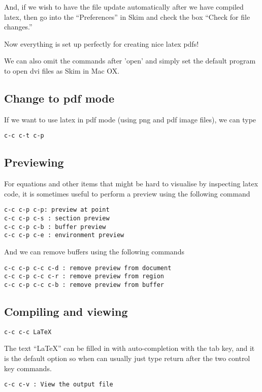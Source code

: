 \documentclass[a4paper, 10pt]{article}
\begin{document}
And, if we wish to have the file update automatically after we have compiled latex, then go into the ``Preferences'' in Skim and check the box ``Check for file changes.''

Now everything is set up perfectly for creating nice latex pdfs!

We can also omit the commands after 'open' and simply set the default
program to open dvi files as Skim in Mac OX.

\subsection*{Change to pdf mode}
\label{sec:change-pdf-mode}

If we want to use latex in pdf mode (using png and pdf image files),
we can type
\begin{verbatim}
c-c c-t c-p
\end{verbatim}

\subsection{Previewing}
\label{sec:previewing}

For equations and other items that might be hard to visualise by
inspecting latex code, it is sometimes useful to perform a preview
using the following command
\begin{verbatim}
c-c c-p c-p: preview at point
c-c c-p c-s : section preview 
c-c c-p c-b : buffer preview
c-c c-p c-e : environment preview
\end{verbatim}

And we can remove buffers using the following commands
\begin{verbatim}
c-c c-p c-c c-d : remove preview from document
c-c c-p c-c c-r : remove preview from region
c-c c-p c-c c-b : remove preview from buffer
\end{verbatim}



\subsection*{Compiling and viewing}
\begin{verbatim}
c-c c-c LaTeX
\end{verbatim}
The text ``LaTeX'' can be filled in with auto-completion with the tab key, and it is the default option so when can usually just type return after the two control key commands.
\begin{verbatim}
c-c c-v : View the output file
\end{verbatim}
\end{document}
